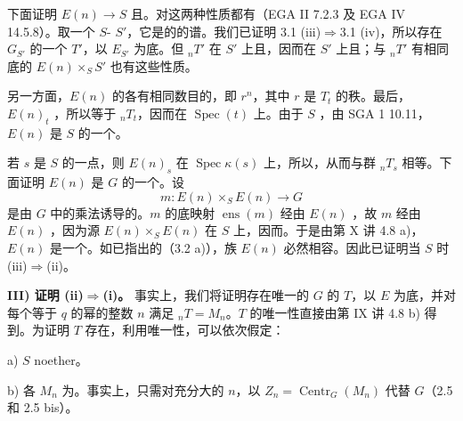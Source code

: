 下面证明 $E(n)\to S$ 且。对这两种性质都有（EGA II 7.2.3 及
EGA IV 14.5.8）。取一个 $S$- $S'$，它是的的谱。我们已证明 3.1 (iii)$\Rightarrow$3.1 (iv)，所以存在 $G_{S'}$ 的一个 $T'$，以 $E_{S'}$ 为底。但 ${}_nT'$ 在 $S'$ 上且，因而在 $S'$ 上且；与 ${}_nT'$ 有相同底的 $E(n)\times_S S'$ 也有这些性质。

另一方面，$E(n)$ 的各有相同数目的，即 $r^n$，其中 $r$ 是 $T_t$ 的秩。最后， $E(n)_t$ ，所以等于 ${}_nT_t$，因而在 $\operatorname{Spec}(t)$ 上。由于 $S$ ，由 SGA 1 10.11，$E(n)$ 是 $S$ 的一个。

若 $s$ 是 $S$ 的一点，则 $E(n)_s$ 在 $\operatorname{Spec}\kappa(s)$ 上，所以，从而与群 ${}_nT_s$ 相等。下面证明 $E(n)$ 是 $G$ 的一个。设
\[m:E(n)\times_S E(n)\longrightarrow G\]
是由 $G$ 中的乘法诱导的。$m$ 的底映射 $\operatorname{ens}(m)$ 经由 $E(n)$ ，故 $m$ 经由 $E(n)$ ，因为源 $E(n)\times_S E(n)$ 在 $S$ 上，因而。于是由第 X 讲 4.8 a)，$E(n)$ 是一个。如已指出的（3.2 a)），族 $E(n)$ 必然相容。因此已证明当 $S$ 时 (iii)$\Rightarrow$(ii)。

\textbf{III) 证明 (ii)$\Rightarrow$(i)。}
事实上，我们将证明存在唯一的 $G$ 的 $T$，以 $E$ 为底，并对每个等于 $q$ 的幂的整数 $n$ 满足 ${}_nT=M_n$。$T$ 的唯一性直接由第 IX 讲 4.8 b) 得到。为证明 $T$ 存在，利用唯一性，可以依次假定：

a) $S$ noether。

b) 各 $M_n$ 为。事实上，只需对充分大的 $n$，以 $Z_n=\operatorname{Centr}_G(M_n)$ 代替 $G$（2.5 和 2.5 bis）。

